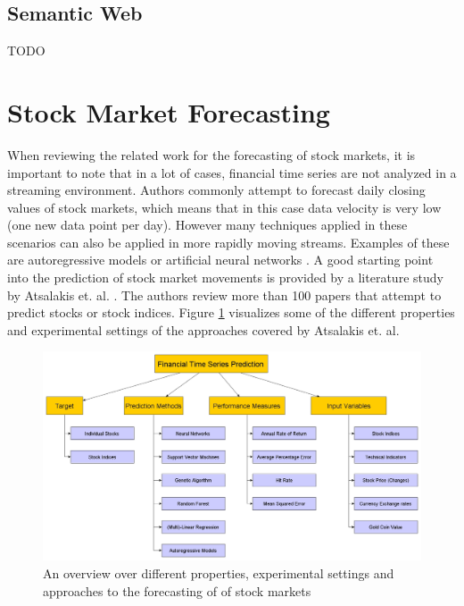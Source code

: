 \subsection{Semantic Web}
\label{subsec_semanticWeb}
TODO



\section{Stock Market Forecasting}
\label{sec_stock_market_prediction}
When reviewing the related work for the forecasting of stock markets, it is important to note that in a lot of cases, financial time series are not analyzed in a streaming environment. Authors commonly attempt to forecast daily closing values of stock markets, which means that in this case data velocity is very low (one new data point per day). However many techniques applied in these scenarios can also be applied in more rapidly moving streams. Examples of these are autoregressive models \cite{terasvirta1994specification} or artificial neural networks \cite{gama2010knowledge}. \newline
A good starting point into the prediction of stock market movements is provided by a literature study by Atsalakis et. al. \cite{atsalakis2009surveying}. The authors review more than 100 papers that attempt to predict stocks or stock indices. Figure \ref{fig_financialTimeSeriesPredictionOverview} visualizes some of the different properties and experimental settings of the approaches covered by Atsalakis et. al.

\begin{figure}[h]
	\centering
  	\includegraphics[width=\textwidth]{financialTimeSeriesPredictionOverview}
	\caption{An overview over different properties, experimental settings and approaches to the forecasting of of stock markets}
	\label{fig_financialTimeSeriesPredictionOverview}
\end{figure}

